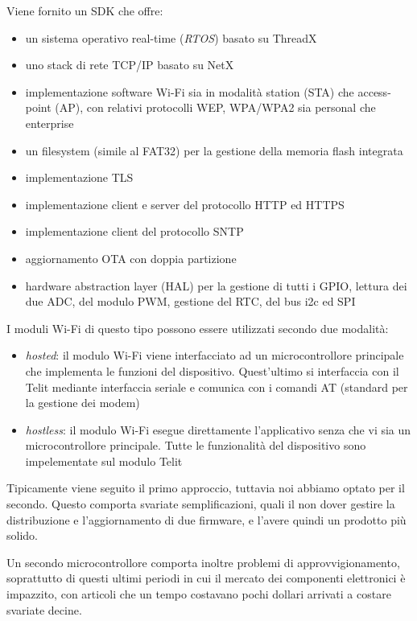 \documentclass[12pt,a4paper,twoside,titlepage]{book}
\begin{document}
Viene fornito un SDK che offre:

\begin{itemize}
    \item un sistema operativo real-time (\textit{RTOS}) basato su ThreadX
    \item uno stack di rete TCP/IP basato su NetX
    \item implementazione software Wi-Fi sia in modalità station (STA) che access-point (AP),
        con relativi protocolli WEP, WPA/WPA2 sia personal che enterprise
    \item un filesystem (simile al FAT32) per la gestione della memoria flash integrata
    \item implementazione TLS
    \item implementazione client e server del protocollo HTTP ed HTTPS
    \item implementazione client del protocollo SNTP
    \item aggiornamento OTA con doppia partizione
    \item hardware abstraction layer (HAL) per la gestione di tutti i GPIO,
        lettura dei due ADC, del modulo PWM, gestione del RTC, del bus i2c ed SPI
\end{itemize}

I moduli Wi-Fi di questo tipo possono essere utilizzati secondo due modalità:
\begin{itemize}
    \item \textit{hosted}: il modulo Wi-Fi viene interfacciato ad un microcontrollore
        principale che implementa le funzioni del dispositivo. Quest'ultimo si interfaccia
        con il Telit mediante interfaccia seriale e comunica con i comandi AT (standard
        per la gestione dei modem)
    \item \textit{hostless}: il modulo Wi-Fi esegue direttamente l'applicativo senza
        che vi sia un microcontrollore principale. Tutte le funzionalità del dispositivo
        sono impelementate sul modulo Telit
\end{itemize}

Tipicamente viene seguito il primo approccio, tuttavia noi abbiamo optato per il secondo.
Questo comporta svariate semplificazioni, quali il non dover gestire la distribuzione
e l'aggiornamento di due firmware, e l'avere quindi un prodotto più solido.

Un secondo microcontrollore comporta inoltre problemi di approvvigionamento, soprattutto di
questi ultimi periodi in cui il mercato dei componenti elettronici è impazzito, con
articoli che un tempo costavano pochi dollari arrivati a costare svariate decine.
\end{document}
